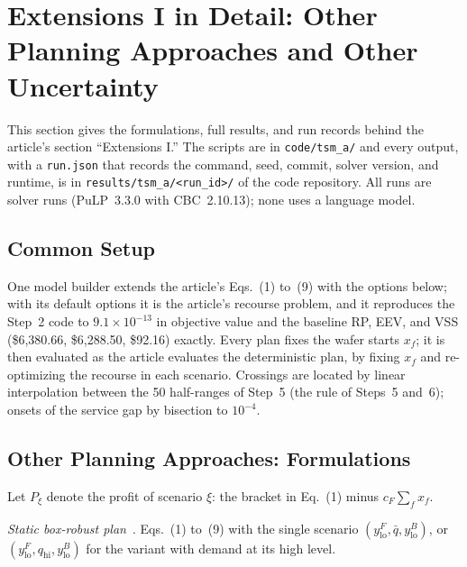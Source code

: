 \section{Extensions I in Detail: Other Planning Approaches and Other Uncertainty}
\label{sec:S-extA}

This section gives the formulations, full results, and run records behind the article's section ``Extensions I.'' The scripts are in \texttt{code/tsm\_a/} and every output, with a \texttt{run.json} that records the command, seed, commit, solver version, and runtime, is in \texttt{results/tsm\_a/<run\_id>/} of the code repository. All runs are solver runs (PuLP~3.3.0 with CBC~2.10.13); none uses a language model.

\subsection{Common Setup}

One model builder extends the article's Eqs.~(1) to~(9) with the options below; with its default options it is the article's recourse problem, and it reproduces the Step~2 code to $9.1\times10^{-13}$ in objective value and the baseline RP, EEV, and VSS (\$6{,}380.66, \$6{,}288.50, \$92.16) exactly. Every plan fixes the wafer starts $x_f$; it is then evaluated as the article evaluates the deterministic plan, by fixing $x_f$ and re-optimizing the recourse in each scenario. Crossings are located by linear interpolation between the 50 half-ranges of Step~5 (the rule of Steps~5 and~6); onsets of the service gap by bisection to $10^{-4}$.

\subsection{Other Planning Approaches: Formulations}

Let $P_\xi$ denote the profit of scenario $\xi$: the bracket in Eq.~(1) minus $c_F\sum_f x_f$.

\emph{Static box-robust plan}~\cite{soyster1973}. Eqs.~(1) to~(9) with the single scenario $(y^F_{\text{lo}},\bar q,y^B_{\text{lo}})$, or $(y^F_{\text{lo}},q_{\text{hi}},y^B_{\text{lo}})$ for the variant with demand at its high level.

